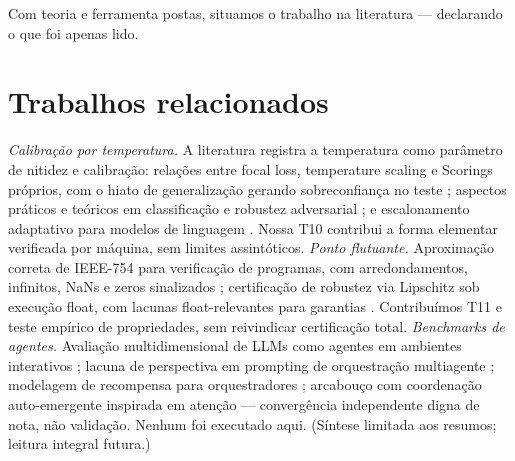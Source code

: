 \documentclass[12pt,openany,oneside,a4paper,brazil,chapter=TITLE]{abntex2}
\let\cite\citep
\begin{document}


Com teoria e ferramenta postas, situamos o trabalho na literatura --- declarando o que foi apenas lido.
\section{Trabalhos relacionados}
\textit{Calibração por temperatura.} A literatura registra a temperatura como parâmetro de nitidez e calibração: relações entre focal loss, temperature scaling e Scorings próprios, com o hiato de generalização gerando sobreconfiança no teste \cite{komisarenko2024}; aspectos práticos e teóricos em classificação e robustez adversarial \cite{xuan2025}; e escalonamento adaptativo para modelos de linguagem \cite{xie2024}. Nossa T10 contribui a forma elementar verificada por máquina, sem limites assintóticos. \textit{Ponto flutuante.} Aproximação correta de IEEE-754 para verificação de programas, com arredondamentos, infinitos, NaNs e zeros sinalizados \cite{bagnara2019}; certificação de robustez via Lipschitz sob execução float, com lacunas float-relevantes para garantias \cite{murray2026}. Contribuímos T11 e teste empírico de propriedades, sem reivindicar certificação total. \textit{Benchmarks de agentes.} Avaliação multidimensional de LLMs como agentes em ambientes interativos \cite{agentbench2023}; lacuna de perspectiva em prompting de orquestração multiagente \cite{perspectivegap2026}; modelagem de recompensa para orquestradores \cite{orchrm2026}; arcabouço com coordenação auto-emergente inspirada em atenção \cite{orchestrator2025} --- convergência independente digna de nota, não validação. Nenhum foi executado aqui. (Síntese limitada aos resumos; leitura integral futura.)
\end{document}
